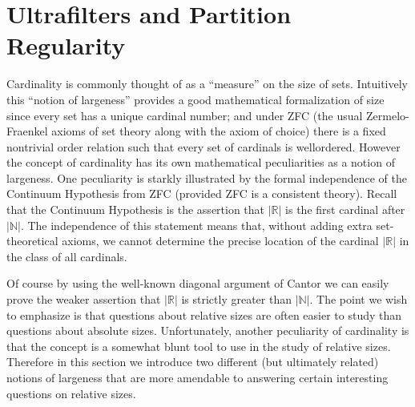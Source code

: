 \documentclass[12pt]{article}
\theoremstyle{plain}
\theoremstyle{definition}
\newcommand{\bbN}{\mathbb{N}}
\newcommand{\bbR}{\mathbb{R}}
\begin{document}
\section{Ultrafilters and Partition Regularity}
Cardinality is commonly thought of as a ``measure'' on the size of sets.
Intuitively this ``notion of largeness'' provides a good mathematical formalization of size since every set has a unique cardinal number; and under ZFC (the usual Zermelo-Fraenkel axioms of set theory along with the axiom of choice) there is a fixed nontrivial order relation such that every set of cardinals is wellordered.
However the concept of cardinality has its own mathematical peculiarities as a notion of largeness.
One peculiarity is starkly illustrated by the formal independence of the Continuum Hypothesis from ZFC (provided ZFC is a consistent theory).
Recall that the Continuum Hypothesis is the assertion that $|\bbR|$ is the first cardinal after $|\bbN|$.
The independence of this statement means that, without adding extra set-theoretical axioms, we cannot determine the precise location of the cardinal $|\bbR|$ in the class of all cardinals.

Of course by using the well-known diagonal argument of Cantor%
we can easily prove the weaker assertion that $|\bbR|$ is strictly greater than $|\bbN|$.
The point we wish to emphasize is that questions about relative sizes are often easier to study than questions about absolute sizes.
Unfortunately, another peculiarity of cardinality is that the concept is a somewhat blunt tool to use in the study of relative sizes.
Therefore in this section we introduce two different (but ultimately related) notions of largeness that are more amendable to answering certain interesting questions on relative sizes.
\end{document}
